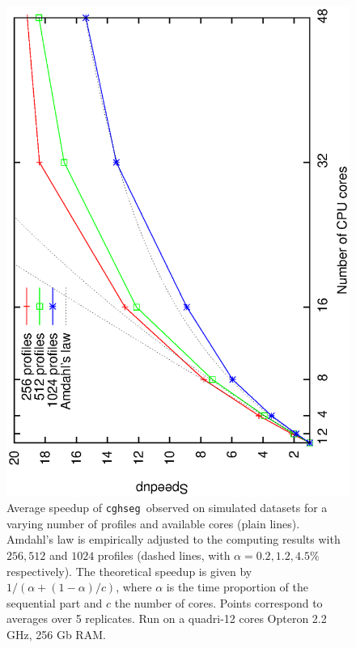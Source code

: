 \documentclass[11pt]{llncs}
\newcommand{\esoft}{\texttt{cghseg }}
\begin{document}
{\begin{figure}[h!]
  \begin{center}
    \includegraphics[scale=0.45,angle=270]{figures/speedup.ps}
    \caption{Average speedup of \esoft observed  on simulated datasets for a varying number of profiles and available cores (plain lines). Amdahl's law is empirically adjusted to the computing results with $256,512$ and $1024$ profiles (dashed lines, with $\alpha=0.2,1.2,4.5\%$ respectively). The theoretical speedup is given by $1/(\alpha+(1-\alpha)/c)$, where $\alpha$ is the time proportion of the sequential part and $c$ the number of cores. Points correspond to averages over 5 replicates. Run on a quadri-12 cores Opteron 2.2 GHz, 256 Gb RAM.}
    \label{figspeedup}
  \end{center}
\end{figure}

}
\end{document}
